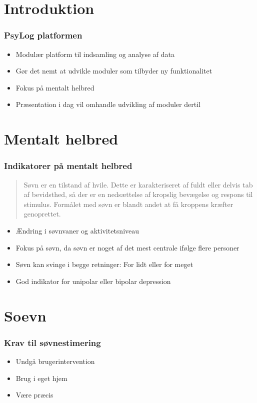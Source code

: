 \section{Introduktion}
\begin{frame}
\frametitle{PsyLog platformen}
	\begin{itemize}
	\item Modulær platform til indsamling og analyse af data
	\item Gør det nemt at udvikle moduler som tilbyder ny funktionalitet
	\item Fokus på mentalt helbred
	\item Præsentation i dag vil omhandle udvikling af moduler dertil
	\end{itemize}
\end{frame}

\section{Mentalt helbred}
\begin{frame}
\frametitle{Indikatorer på mentalt helbred}
	\begin{quote}
		Søvn er en tilstand af hvile. Dette er karakteriseret af fuldt eller delvis tab af bevidsthed, så der er en nedsættelse af kropslig bevægelse og respons til stimulus. Formålet med søvn er blandt andet at få kroppens kræfter genoprettet.
	\end{quote}	
	\begin{itemize}
	\item Ændring i søvnvaner og aktivitetsniveau
	\item Fokus på søvn, da søvn er noget af det mest centrale ifølge flere personer
	\item Søvn kan svinge i begge retninger: For lidt eller for meget
	\item God indikator for unipolar eller bipolar depression
	\end{itemize}
\end{frame}

\section{Soevn}
\begin{frame}
\frametitle{Krav til søvnestimering}
	\begin{itemize}
	\item Undgå brugerintervention
	\item Brug i eget hjem
	\item Være præcis
	\end{itemize}
\end{frame}

